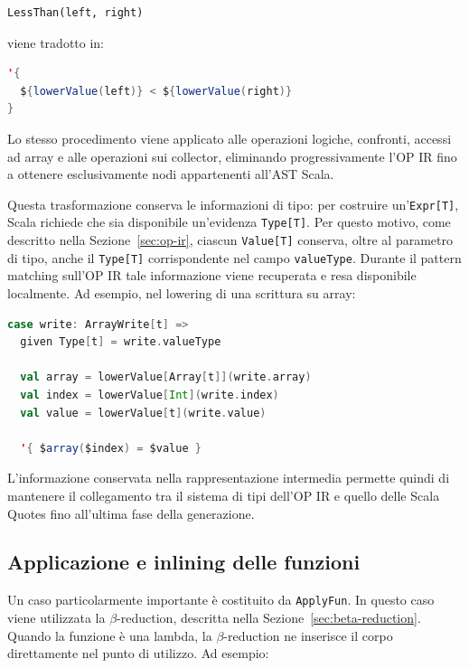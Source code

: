 \documentclass[a4paper,11pt]{report}
\theoremstyle{definition}
\begin{document}
\begin{lstlisting}[language=OPIR]
LessThan(left, right)
\end{lstlisting}

viene tradotto in:

\begin{lstlisting}[language=Scala]
'{
  ${lowerValue(left)} < ${lowerValue(right)}
}
\end{lstlisting}

Lo stesso procedimento viene applicato alle operazioni logiche, confronti, accessi ad array e alle operazioni sui collector, eliminando progressivamente l'OP IR fino a ottenere esclusivamente nodi appartenenti all'AST Scala.

\label{subsec:lowering-type-preservation}
Questa trasformazione conserva le informazioni di tipo: per costruire un'\texttt{Expr[T]}, Scala richiede che sia disponibile un'evidenza \texttt{Type[T]}. Per questo motivo, come descritto nella Sezione~\ref{sec:op-ir}, ciascun \texttt{Value[T]} conserva, oltre al parametro di tipo, anche il \texttt{Type[T]} corrispondente nel campo \texttt{valueType}. Durante il pattern matching sull'OP IR tale informazione viene recuperata e resa disponibile localmente. Ad esempio, nel lowering di una scrittura su array:

\begin{lstlisting}[language=Scala]
case write: ArrayWrite[t] =>
  given Type[t] = write.valueType

  val array = lowerValue[Array[t]](write.array)
  val index = lowerValue[Int](write.index)
  val value = lowerValue[t](write.value)

  '{ $array($index) = $value }
\end{lstlisting}

L'informazione conservata nella rappresentazione intermedia permette quindi di mantenere il collegamento tra il sistema di tipi dell'OP IR e quello delle Scala Quotes fino all'ultima fase della generazione.

\subsection{Applicazione e inlining delle funzioni}

Un caso particolarmente importante è costituito da \texttt{ApplyFun}. In questo caso viene utilizzata la $\beta$-reduction, descritta nella Sezione~\ref{sec:beta-reduction}. Quando la funzione è una lambda, la $\beta$-reduction ne inserisce il corpo direttamente nel punto di utilizzo. Ad esempio:
\end{document}

